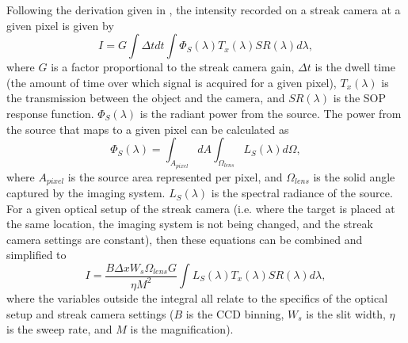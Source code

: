 Following the derivation given in \cite{Miller2007}, the intensity recorded on a streak camera at a given pixel is given by \begin{equation} I = G \int {\Delta t} dt \int {\Phi_S(\lambda) T_x(\lambda)SR(\lambda) d\lambda}, \end{equation} where $G$ is a factor proportional to the streak camera gain, $\Delta t$ is the dwell time (the amount of time over which signal is acquired for a given pixel), $T_x(\lambda)$ is the transmission between the object and the camera, and $SR(\lambda)$ is the SOP response function. $\Phi_S(\lambda)$ is the radiant power from the source. The power from the source that maps to a given pixel can be calculated as 
\begin{equation} \Phi_S(\lambda) =  \int_{A_{pixel}}{ dA} \int_{\Omega_{lens}} { L_S(\lambda) d\Omega}, \end{equation}
where $A_{pixel}$ is the source area represented per pixel, and $\Omega_{lens}$ is the solid angle captured by the imaging system. $L_S (\lambda)$ is the spectral radiance of the source. For a given optical setup of the streak camera (i.e. where the target is placed at the same location, the imaging system is not being changed, and the streak camera settings are constant), then these equations can be combined and simplified to 
\begin{equation} I = \frac{B \Delta x W_s \Omega_{lens} G}{\eta M^2} \int {L_S(\lambda) T_x(\lambda)SR(\lambda) d\lambda}, \end{equation} where the variables outside the integral all relate to the specifics of the optical setup and streak camera settings ($B$ is the CCD binning, $W_s$ is the slit width, $\eta$ is the sweep rate, and $M$ is the magnification).

